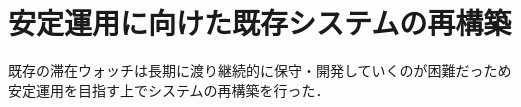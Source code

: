 





\section{安定運用に向けた既存システムの再構築}\label{4.1}

既存の滞在ウォッチは長期に渡り継続的に保守・開発していくのが困難だっため安定運用を目指す上でシステムの再構築を行った．














